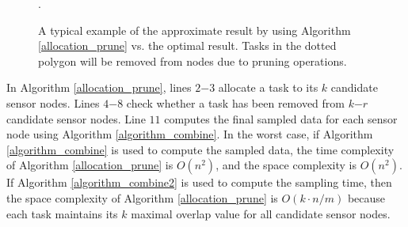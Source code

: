 \documentclass[prodmode,acmtosn]{acmsmall}
\begin{document}
\begin{figure}[t]
\centering
{}
\caption{A typical example of the approximate result by using Algorithm \ref{allocation_prune} vs. the optimal result.  Tasks in the dotted polygon will be removed from nodes due to pruning operations.}.
\label{figure_prune_example}
\end{figure}

In Algorithm \ref{allocation_prune}, lines $2\mathrm{-}3$ allocate a task to its $k$ candidate sensor nodes.  Lines $4\mathrm{-}8$ check whether a task has been removed from $k\mathrm{-}r$ candidate sensor nodes. Line $11$ computes the final sampled data for each sensor node using Algorithm \ref{algorithm_combine}. In the worst case, if Algorithm \ref{algorithm_combine} is used to compute the sampled data, the time complexity of Algorithm \ref{allocation_prune} is $O(n^2)$, and the space complexity is $O(n^2)$. If Algorithm \ref{algorithm_combine2} is used to compute the sampling time, then the space complexity of Algorithm \ref{allocation_prune} is $O(k\cdot n/m)$ because each task maintains its $k$ maximal overlap value for all candidate sensor nodes.
\end{document}
